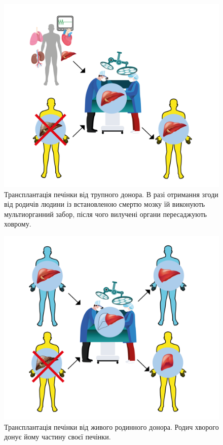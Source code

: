\begin{figure}
  \includegraphics[width=\linewidth]{Figures/LTx-simple_DDLT.png}
  \caption{Трансплантація печінки від трупного донора. В разі отримання згоди від родичів людини із встановленою смертю мозку їй виконують мультиорганний забор, після чого вилучені органи пересаджують ховрому.}
  \label{fig:ddlt}
\end{figure}

\begin{figure}
  \includegraphics[width=\linewidth]{Figures/LTx-simple_LDLT.png}
  \caption{Трансплантація печінки від живого родинного донора. Родич хворого донує йому частину своєї печінки.}
  \label{fig:ldlt}
\end{figure}

